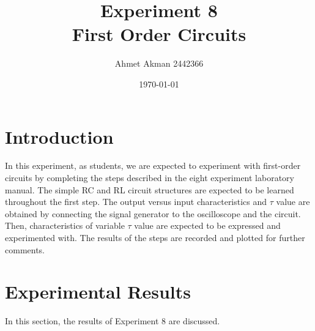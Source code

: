 \documentclass[letterpaper,12pt]{article}
\begin{document}
\title{Experiment 8 \protect\\First Order Circuits}
\author{Ahmet Akman 2442366 }
\date{\today}
\maketitle
\newpage
\tableofcontents
\newpage

\section{Introduction} 
In this experiment, as students, we are expected to experiment with first-order circuits by completing the steps described in the eight experiment laboratory manual. The simple RC and RL circuit structures are expected to be learned throughout the first step. The output versus input characteristics and \(\tau\) value are obtained by connecting the signal generator to the oscilloscope and the circuit. Then, characteristics of variable \(\tau\) value are expected to be expressed and experimented with. The results of the steps are recorded and plotted for further comments.
\section{Experimental Results}
In this section, the results of Experiment 8 are discussed. 
\end{document}
